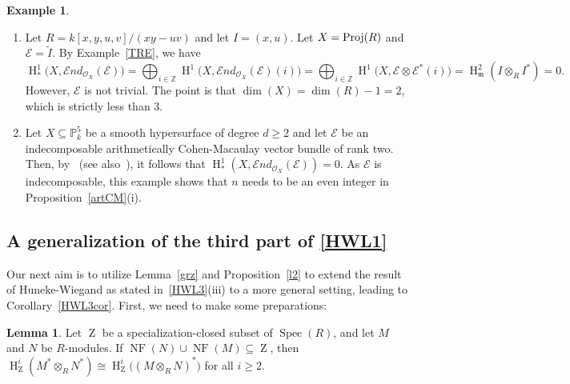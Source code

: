 \documentclass[11pt]{amsart}
\theoremstyle{definition}
\theoremstyle{definition}
\newtheorem{lem}[thm]{Lemma}
\newtheorem{eg}[thm]{Example}
\numberwithin{equation}{section}
\newcommand{\fm}{\mathfrak{m}}
\DeclareMathOperator{\mz}{Z}
\DeclareMathOperator{\hh}{H}
\DeclareMathOperator{\Spec}{Spec}
\DeclareMathOperator{\NF}{NF}
\begin{document}
\begin{eg}$\phantom{}$
\begin{enumerate}[\rm(i)]
\item Let $R=k[x,y,u,v]/(xy-uv)$ and let $I=(x,u)$. Let $X=\textmd{Proj}(R)$ and $\mathcal{E}=\widetilde{I}$. By Example~\ref{TRE}, we have
$$\hh^1_\ast\big(X,\mathcal{E}nd_{\mathcal{O}_X}(\mathcal{\mathcal{E}})\big)=\bigoplus_{i\in\mathbb{Z}}\hh^1\big(X,\mathcal{E}nd_{\mathcal{O}_X}(\mathcal{\mathcal{E}})(i)\big)=\bigoplus_{i\in\mathbb{Z}}\hh^1\big(X,\mathcal{\mathcal{E}}\otimes \mathcal{\mathcal{\mathcal{E}}}^\ast(i)\big) =\hh^2_{\fm}(I\otimes_RI^*)=0.$$ However, $\mathcal{E}$ is not trivial. The point is that $\dim(X)=\dim(R)-1=2$, which is strictly less than $3$.\smallskip
\item Let $X\subseteq \mathbb{P}^5_k$ be a smooth hypersurface of degree $d \geq 2$ and let $\mathcal{E}$ be an indecomposable arithmetically Cohen-Macaulay vector bundle of rank two. Then, by~\cite[1.1.(2)]{Kum} (see also~\cite[1.1.2]{Kem}), it follows that $\hh^1_{\ast}(X,\mathcal{E}nd_{\mathcal{O}_X}(\mathcal{\mathcal{E}}))=0$. As $\mathcal{E}$ is indecomposable, this example shows that $n$ needs to be an even integer in Proposition~\ref{artCM}(i).
\end{enumerate}
\end{eg}

\subsection*{A generalization of the third part of \ref{HWL1}}

Our next aim is to utilize Lemma~\ref{grz} and Proposition~\ref{l2} to extend the result of Huneke-Wiegand as stated in~\ref{HWL3}(iii) to a more general setting, leading to Corollary~\ref{HWL3cor}. First, we need to make some preparations:

\begin{lem} \label{star} Let $\mz$ be a specialization-closed subset of $\Spec(R)$, and let $M$ and $N$ be $R$-modules. If $\NF(N)\cup\NF(M)\subseteq\mz$, then $\hh_{\mz}^i(M^\ast\otimes_RN^\ast) \cong \hh_{\mz}^i\big((M\otimes_RN)^\ast\big)$ for all $i\geq 2$.
\end{lem}
\end{document}
